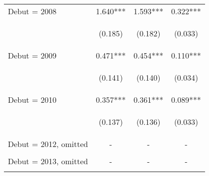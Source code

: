 \begin{center}
\begin{tabular}{lccc}
Debut = 2008 & 1.640*** & 1.593*** & 0.322*** \\
\vspace{4pt} & \begin{footnotesize}(0.185)\end{footnotesize} & \begin{footnotesize}(0.182)\end{footnotesize} & \begin{footnotesize}(0.033)\end{footnotesize} \\
Debut = 2009 & 0.471*** & 0.454*** & 0.110*** \\
\vspace{4pt} & \begin{footnotesize}(0.141)\end{footnotesize} & \begin{footnotesize}(0.140)\end{footnotesize} & \begin{footnotesize}(0.034)\end{footnotesize} \\
Debut = 2010 & 0.357*** & 0.361*** & 0.089*** \\
\vspace{4pt} & \begin{footnotesize}(0.137)\end{footnotesize} & \begin{footnotesize}(0.136)\end{footnotesize} & \begin{footnotesize}(0.033)\end{footnotesize} \\
Debut = 2012, omitted & - & - & - \\
\vspace{4pt} & \begin{footnotesize}\end{footnotesize} & \begin{footnotesize}\end{footnotesize} & \begin{footnotesize}\end{footnotesize} \\
Debut = 2013, omitted & - & - & - \\
\vspace{4pt} & \begin{footnotesize}\end{footnotesize} & \begin{footnotesize}\end{footnotesize} & \begin{footnotesize}\end{footnotesize} \\

\end{tabular}
\end{center}

